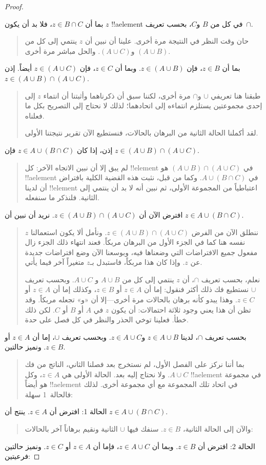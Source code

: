 \documentclass[../../../include/open-logic-section]{subfiles}
\begin{document}
\begin{proof}
\begin{quote}
\end{quote}
بما أن $z \in B \cap C$، فلا بد أن يكون $z$ !!a{element} في كل من
$B$ و$C$، بحسب تعريف~$\cap$.
\begin{quote}
حان وقت النظر في النتيجة مرة أخرى. علينا أن نبين أن $z$ ينتمي إلى كل
من $(A \cup B)$ و$(A \cup C)$. والحل مباشر مرة أخرى.
\end{quote}
بما أن $z \in B$، فإن $z \in (A \cup B)$. وبما أن $z \in C$، فإن
$z \in (A \cup C)$ أيضاً. إذن
$z \in (A \cup B) \cap (A \cup C)$.
\begin{quote}
طبقنا هنا تعريفي $\cup$ و$\cap$ مرة أخرى، لكننا سبق أن ذكرناهما وأثبتنا
أن انتماء $z$ إلى إحدى مجموعتين يستلزم انتماءه إلى اتحادهما؛ لذلك لا
نحتاج إلى التصريح بكل ما فعلناه.

لقد أكملنا الحالة الثانية من البرهان بالحالات، فنستطيع الآن تقرير
نتيجتنا الأولى.
\end{quote}
إذن، إذا كان $z \in A \cup (B \cap C)$ فإن
$z \in (A \cup B) \cap (A \cup C)$.
\begin{quote}
لم يبق إلا أن نبين الاتجاه الآخر: كل !!{element} في
$(A \cup B) \cap (A \cup C)$ هو !!a{element} في
$A \cup (B \cap C)$. وكما من قبل، نثبت هذه القضية الكلية بافتراض أن
لدينا !!{element} اعتباطياً من المجموعة الأولى، ثم نبين أنه لا بد أن
ينتمي إلى الثانية. فلنذكر ما سنفعله.
\end{quote}
افترض الآن أن $z \in (A \cup B) \cap (A \cup C)$. نريد أن نبين أن
$z \in A \cup (B \cap C)$.
\begin{quote}
ننطلق الآن من الفرض $z \in (A \cup B) \cap (A \cup C)$. ونأمل ألا
يكون استعمالنا $z$ نفسه هنا كما في الجزء الأول من البرهان مربكاً. فعند
انتهاء ذلك الجزء زال مفعول جميع الافتراضات التي وضعناها فيه، وبوسعنا
الآن وضع افتراضات جديدة عن $z$. وإذا كان هذا مربكاً، فاستبدل بـ$z$
متغيراً آخر فيما يأتي.

نعلم، بحسب تعريف $\cap$، أن $z$ ينتمي إلى كل من $A \cup B$ و
$A \cup C$. وبحسب تعريف $\cup$ نستطيع فك ذلك أكثر فنقول: إما أن
$z \in A$ أو $z \in B$، وكذلك إما أن $z \in A$ أو $z \in C$.
وهذا يبدو كأنه برهان بالحالات مرة أخرى---إلا أن «و» تجعله مربكاً. وقد
تظن أن هذا يعني وجود ثلاثة احتمالات: أن يكون $z$ في $A$ أو $B$ أو
$C$. لكن ذلك خطأ. فعلينا توخي الحذر والنظر في كل فصل على حدة.
\end{quote}
بحسب تعريف $\cap$، لدينا $z \in A \cup B$ و$z \in A \cup C$. وبحسب
تعريف $\cup$، إما أن $z \in A$ أو $z \in B$. ونميز حالتين.
\begin{quote}
بما أننا نركز على الفصل الأول، لم نستخرج بعد فصلنا الثاني، الناتج من
فك $A \cup C$. ولا نحتاج إليه بعد. الحالة الأولى هي $z \in A$، وكل
!!a{element} في مجموعة هو أيضاً !!a{element} في اتحاد تلك المجموعة مع
أي مجموعة أخرى. لذلك فالحالة~1 سهلة:
\end{quote}
الحالة 1: افترض أن $z \in A$. ينتج أن $z \in A \cup (B \cap C)$.
\begin{quote}
والآن إلى الحالة الثانية، $z \in B$. سنفك فيها $\cup$ الثانية ونقيم
برهاناً آخر بالحالات:
\end{quote}
الحالة 2: افترض أن $z \in B$. وبما أن $z \in A \cup C$، فإما أن
$z \in A$ أو $z \in C$. ونميز حالتين فرعيتين:


\end{proof}
\end{document}
